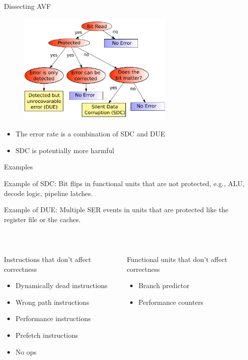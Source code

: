 \documentclass{beamer}
\begin{document}
\begin{frame}{Dissecting AVF}
\begin{center}
 \begin{figure}[h]
    \includegraphics[width=3in]{sdc-due}
 \end{figure}
\end{center}

\begin{itemize}
 \item The error rate is a combination of SDC and DUE
\item SDC is potentially more harmful
\end{itemize}

\end{frame}

\begin{frame}[shrink=10]{Examples}
 \begin{example}{Example of SDC: }
  Bit flips in functional units that are not protected, e.g., ALU, decode logic, pipeline latches.
 \end{example}
 \begin{example}{Example of DUE: }
    Multiple SER  events in units that are protected like the register file or the caches.
 \end{example}

{\color{blue}{When is there no error?} } \\
\begin{columns}[t]
\pause
\begin{column}{0.6\textwidth}
Instructions that don't affect correctness
\begin{itemize}
 \item Dynamically dead instructions
 \item Wrong path instructions
  \item Performance instructions
  \item Prefetch instructions
  \item No ops
\end{itemize}
\end{column}
\pause
\begin{column}{0.4\textwidth}
Functional units that don't affect correctness
\begin{itemize}
 \item Branch predictor
  \item Performance counters
\end{itemize}
\end{column}

\end{columns}
\end{frame}
\end{document}

